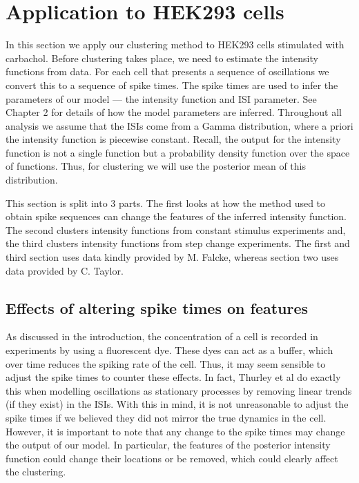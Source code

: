 \documentclass[12pt]{book} %
\begin{document}
\section{Application to HEK293 cells}

In this section we apply our clustering method to HEK293 cells stimulated with carbachol. Before clustering takes place, we need to estimate the intensity functions from data. For each cell that presents a sequence of  oscillations we convert this to a sequence of  spike times. The  spike times are used to infer the parameters of our model --- the intensity function and ISI parameter. See Chapter 2 for details of how the model parameters are inferred. Throughout all analysis we assume that the ISIs come from a Gamma distribution, where a priori the intensity function is piecewise constant.  Recall, the output for the intensity function is not a single function but a probability density function over the space of functions. Thus, for clustering we will use the posterior mean of this distribution.  
  
This section is split into 3 parts. The first looks at how the method used to obtain  spike sequences can change the features of the inferred intensity function. The second clusters intensity functions from constant stimulus experiments and, the third clusters intensity functions from step change experiments. The first and third section uses data kindly provided by M. Falcke, whereas section two uses data provided by C. Taylor. 

\subsection{Effects of altering  spike times on features}

As discussed in the introduction, the  concentration of a cell is recorded in experiments by using a fluorescent dye. These dyes can act as a  buffer, which over time reduces the spiking rate of the cell. Thus, it may seem sensible to adjust the  spike times to counter these effects. In fact, Thurley et al \cite{} do exactly this when modelling  oscillations as stationary processes by removing linear trends (if they exist) in the ISIs. With this in mind, it is not unreasonable to adjust the  spike times if we believed they did not mirror the true dynamics in the cell. However, it is important to note that any change to the  spike times may change the output of our model. In particular, the features of the posterior intensity function could change their locations or be removed, which could clearly affect the clustering.
\end{document}
